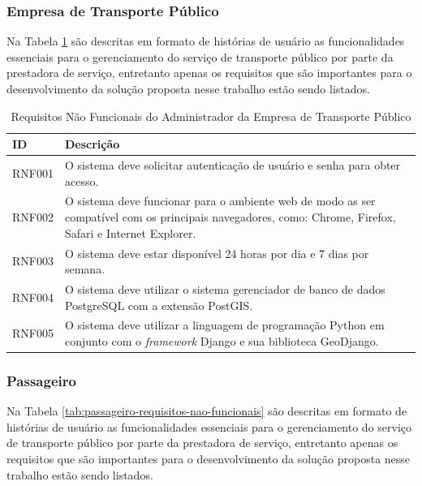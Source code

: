 {{\subsubsection*{Empresa de Transporte Público}

Na Tabela \ref{tab:empresa-requisitos-nao-funcionais} são descritas em formato de histórias de usuário as funcionalidades essenciais para o gerenciamento do serviço de transporte público por parte da prestadora de serviço, entretanto apenas os requisitos que são importantes para o desenvolvimento da solução proposta nesse trabalho estão sendo listados.

{\renewcommand{\arraystretch}{2}
\begin{table}[H]
\centering
\caption{Requisitos Não Funcionais do Administrador da Empresa de Transporte Público}
\label{tab:empresa-requisitos-nao-funcionais}
\begin{tabular}{ l | p{13.5cm} }
\hline
\textbf{ID} & \textbf{Descrição} \\
\hline
RNF001 & O sistema deve solicitar autenticação de usuário e senha para obter acesso. \\ \hline
RNF002 & O sistema deve funcionar para o ambiente web de modo as ser compatível com os principais navegadores, como: Chrome, Firefox, Safari e Internet Explorer. \\ \hline
RNF003 & O sistema deve estar disponível 24 horas por dia e 7 dias por semana. \\ \hline
RNF004 & O sistema deve utilizar o sistema gerenciador de banco de dados PostgreSQL com a extensão PostGIS. \\ \hline
RNF005 & O sistema deve utilizar a linguagem de programação Python em conjunto com o \textit{framework} Django e sua biblioteca GeoDjango. \\ \hline
\end{tabular}
\end{table}

\subsubsection*{Passageiro}

Na Tabela \ref{tab:passageiro-requisitos-nao-funcionais} são descritas em formato de histórias de usuário as funcionalidades essenciais para o gerenciamento do serviço de transporte público por parte da prestadora de serviço, entretanto apenas os requisitos que são importantes para o desenvolvimento da solução proposta nesse trabalho estão sendo listados.

}}}

